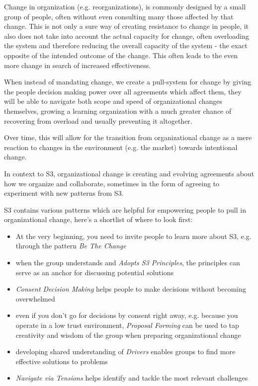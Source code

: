 Change in organization (e.g. reorganizations), is commonly designed by a small group of people, often without even consulting many those affected by that change. This is not only a sure way of creating resistance to change in people, it also does not take into account the actual capacity for change, often overloading the system and therefore reducing the overall capacity of the system - the exact opposite of the intended outcome of the change. This often leads to the even more change in search of increased effectiveness.

When instead of mandating change, we create a pull-system for change by giving the people decision making power over all agreements which affect them, they will be able to navigate both scope and speed of organizational changes themselves, growing a learning organization with a much greater chance of recovering from overload and usually preventing it altogether.

Over time, this will allow for the transition from organizational change as a mere reaction to changes in the environment (e.g. the market) towards intentional change.

In context to S3, organizational change is creating and evolving agreements about how we organize and collaborate, sometimes in the form of agreeing to experiment with new patterns from S3.

S3 contains various patterns which are helpful for empowering people to pull in organizational change, here's a shortlist of where to look first:

\begin{itemize}
\item At the very beginning, you need to invite people to learn more about S3, e.g. through the pattern \emph{Be The Change}

\item when the group understands and \emph{Adopts S3 Principles}, the principles can serve as an anchor for discussing potential solutions

\item \emph{Consent Decision Making} helps people to make decisions without becoming overwhelmed

\item even if you don't go for decisions by consent right away, e.g. because you operate in a low trust environment, \emph{Proposal Forming} can be used to tap creativity and wisdom of the group when preparing organizational change

\item developing shared understanding of \emph{Drivers} enables groups to find more effective solutions to problems

\item \emph{Navigate via Tensions} helps identify and tackle the most relevant challenges

\end{itemize}

